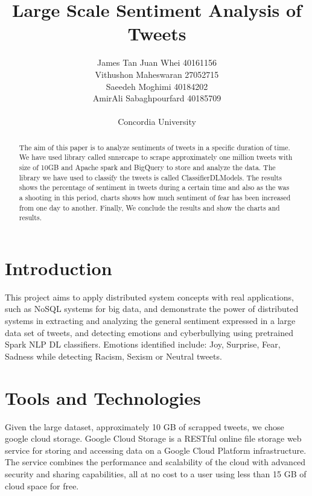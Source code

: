 \documentclass[a4paper,12pt]{article}
\begin{document}
\title{Large Scale Sentiment Analysis of Tweets }%
\author{
	James Tan Juan Whei 40161156\\
	Vithushon Maheswaran 27052715\\
	Saeedeh Moghimi 40184202\\
	AmirAli Sabaghpourfard 40185709\\
	\\Concordia University
}
\maketitle

\begin{abstract}
The aim of this paper is to analyze sentiments of tweets in a specific duration of time. We have used library called snnsrcape to
scrape approximately one million tweets with size of 10GB and Apache spark and BigQuery to store and analyze the data.
The library we have used to classify the tweets is called ClassifierDLModels. The results shows the percentage of sentiment in
tweets during a certain time and also as the was a shooting in this period, charts shows how much sentiment of fear has been increased
from one day to another. Finally, We conclude the results and show the charts and results.
\end{abstract}

\section{Introduction}

This project aims to apply distributed system concepts with real applications, such as NoSQL systems for big data,
and demonstrate the power of distributed systems in extracting and analyzing the general sentiment expressed in a large
data set of tweets, and detecting emotions and cyberbullying using pretrained Spark NLP DL classifiers.
Emotions identified include: Joy, Surprise, Fear, Sadness while detecting Racism, Sexism or Neutral tweets.

\section{Tools and Technologies}

Given the large dataset, approximately 10 GB of scrapped tweets, we chose google cloud storage.
Google Cloud Storage is a RESTful online file storage web service for storing and accessing data on a Google Cloud
Platform infrastructure. The service combines the performance and scalability of the cloud with advanced
security and sharing capabilities, all at no cost to a user using less than 15 GB of cloud space for free.
\end{document}
